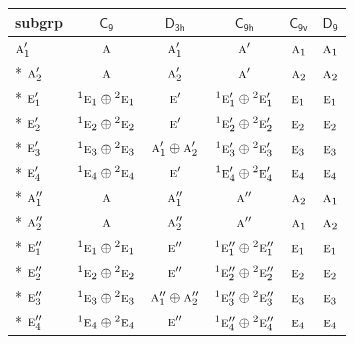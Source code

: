 \documentclass[10pt,a4paper]{article}
\numberwithin{equation}{section}
\newcommand{\grp}[1]{\mathsf{#1}}
\newcommand{\irr}[1]{\text{\normalfont\scshape #1}}
\newcommand{\conjpair}[1]{{}^{#1}}
\begin{document}
{\small\begin{longtable}{@{}lccccc@{}}\toprule
subgrp & \href{C9.pdf}{$\grp{C_{9}}$} & \href{D3h.pdf}{$\grp{D_{3h}}$} & \href{C9h.pdf}{$\grp{C_{9h}}$} & \href{C9v.pdf}{$\grp{C_{9v}}$} & \href{D9.pdf}{$\grp{D_{9}}$}\\\midrule\endhead
\bottomrule\endfoot\endlastfoot
$\irr{a}_{1}'$ & $\irr{a}$ & $\irr{a}_{1}'$ & $\irr{a}'$ & $\irr{a}_{1}$ & $\irr{a}_{1}$\\*
$\irr{a}_{2}'$ & $\irr{a}$ & $\irr{a}_{2}'$ & $\irr{a}'$ & $\irr{a}_{2}$ & $\irr{a}_{2}$\\*
$\irr{e}_{1}'$ & $\conjpair{1}\irr{e}_{1}\oplus \conjpair{2}\irr{e}_{1}$ & $\irr{e}'$ & $\conjpair{1}\irr{e}_{1}'\oplus \conjpair{2}\irr{e}_{1}'$ & $\irr{e}_{1}$ & $\irr{e}_{1}$\\*
$\irr{e}_{2}'$ & $\conjpair{1}\irr{e}_{2}\oplus \conjpair{2}\irr{e}_{2}$ & $\irr{e}'$ & $\conjpair{1}\irr{e}_{2}'\oplus \conjpair{2}\irr{e}_{2}'$ & $\irr{e}_{2}$ & $\irr{e}_{2}$\\*
$\irr{e}_{3}'$ & $\conjpair{1}\irr{e}_{3}\oplus \conjpair{2}\irr{e}_{3}$ & $\irr{a}_{1}'\oplus \irr{a}_{2}'$ & $\conjpair{1}\irr{e}_{3}'\oplus \conjpair{2}\irr{e}_{3}'$ & $\irr{e}_{3}$ & $\irr{e}_{3}$\\*
$\irr{e}_{4}'$ & $\conjpair{1}\irr{e}_{4}\oplus \conjpair{2}\irr{e}_{4}$ & $\irr{e}'$ & $\conjpair{1}\irr{e}_{4}'\oplus \conjpair{2}\irr{e}_{4}'$ & $\irr{e}_{4}$ & $\irr{e}_{4}$\\*
$\irr{a}_{1}''$ & $\irr{a}$ & $\irr{a}_{1}''$ & $\irr{a}''$ & $\irr{a}_{2}$ & $\irr{a}_{1}$\\*
$\irr{a}_{2}''$ & $\irr{a}$ & $\irr{a}_{2}''$ & $\irr{a}''$ & $\irr{a}_{1}$ & $\irr{a}_{2}$\\*
$\irr{e}_{1}''$ & $\conjpair{1}\irr{e}_{1}\oplus \conjpair{2}\irr{e}_{1}$ & $\irr{e}''$ & $\conjpair{1}\irr{e}_{1}''\oplus \conjpair{2}\irr{e}_{1}''$ & $\irr{e}_{1}$ & $\irr{e}_{1}$\\*
$\irr{e}_{2}''$ & $\conjpair{1}\irr{e}_{2}\oplus \conjpair{2}\irr{e}_{2}$ & $\irr{e}''$ & $\conjpair{1}\irr{e}_{2}''\oplus \conjpair{2}\irr{e}_{2}''$ & $\irr{e}_{2}$ & $\irr{e}_{2}$\\*
$\irr{e}_{3}''$ & $\conjpair{1}\irr{e}_{3}\oplus \conjpair{2}\irr{e}_{3}$ & $\irr{a}_{1}''\oplus \irr{a}_{2}''$ & $\conjpair{1}\irr{e}_{3}''\oplus \conjpair{2}\irr{e}_{3}''$ & $\irr{e}_{3}$ & $\irr{e}_{3}$\\*
$\irr{e}_{4}''$ & $\conjpair{1}\irr{e}_{4}\oplus \conjpair{2}\irr{e}_{4}$ & $\irr{e}''$ & $\conjpair{1}\irr{e}_{4}''\oplus \conjpair{2}\irr{e}_{4}''$ & $\irr{e}_{4}$ & $\irr{e}_{4}$\\
\bottomrule\end{longtable}}
\end{document}
